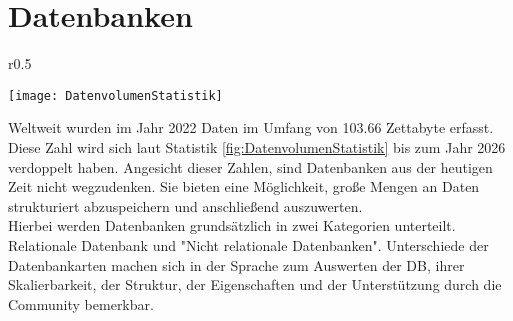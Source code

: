 \section{Datenbanken}\label{sec:Datenbank}
\begin{wrapfigure}{r}{0.5\textwidth}
    \vspace{-1.2cm}
    \begin{center}
      \texttt{[image: DatenvolumenStatistik]}
    \end{center}
    \vspace{-0.5cm}
    \caption{Volumen der weltweit generierten Daten bis 2027 \cite{Datenmengen}}
    \label{fig:DatenvolumenStatistik}
    \vspace{-0.5cm}
  \end{wrapfigure}
Weltweit wurden im Jahr 2022 Daten im Umfang von 103.66 Zettabyte erfasst. Diese Zahl wird sich laut Statistik \ref{fig:DatenvolumenStatistik} bis zum Jahr 2026 verdoppelt haben. Angesicht dieser Zahlen, sind Datenbanken aus der heutigen Zeit nicht wegzudenken. Sie bieten eine Möglichkeit, große Mengen an Daten strukturiert abzuspeichern und anschließend auszuwerten.\\
Hierbei werden Datenbanken grundsätzlich in zwei Kategorien unterteilt. Relationale Datenbank und "Nicht relationale Datenbanken". Unterschiede der Datenbankarten machen sich in der Sprache zum Auswerten der DB, ihrer Skalierbarkeit, der Struktur, der Eigenschaften und der Unterstützung durch die Community bemerkbar. 

